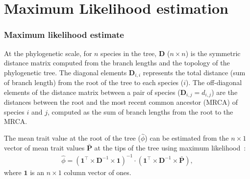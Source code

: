 \documentclass{article}
\newcommand{\Multiply}{\cdot}
\newcommand{\MultiplyMatrix}{\times}
\newcommand{\UniDimArray}[1]{\bm{#1}}
\newcommand{\BiDimArray}[1]{\bm{#1}}
\newcommand{\tr}{^{\intercal}}
\newcommand{\inv}{^{-1}}
\newcommand{\Trait}{P}
\newcommand{\Spi}{i}
\newcommand{\Spj}{j}
\newcommand{\NbrTaxa}{n}
\newcommand{\NucDiv}{d_{\Spi, \Spj}}
\newcommand{\VecTrait}{\UniDimArray{\bar{\Trait}}}
\newcommand{\VecOne}{\UniDimArray{1}}
\newcommand{\Distance}{\BiDimArray{D}}
\newcommand{\DistanceMatrix}{\BiDimArray{\Distance}}
\newcommand{\RootTrait}{\phi}
\newcommand{\EstRootTrait}{\hat{\RootTrait}}
\begin{document}
\newpage
\section{Maximum Likelihood estimation}\label{sec:maximum-likelihood-estimation}

\subsubsection*{Maximum likelihood estimate}
At the phylogenetic scale, for $\NbrTaxa$ species in the tree, $\DistanceMatrix$ ($\NbrTaxa \times \NbrTaxa$) is the symmetric distance matrix computed from the branch lengths and the topology of the phylogenetic tree.
The diagonal elements $\Distance_{\Spi,\Spi}$ represents the total distance (sum of branch length) from the root of the tree to each species ($\Spi$).
The off-diagonal elements of the distance matrix between a pair of species ($\Distance_{\Spi,\Spj} = \NucDiv$) are the distances between the root and the most recent common ancestor (MRCA) of species $\Spi$ and $\Spj$, computed as the sum of branch lengths from the root to the MRCA.

The mean trait value at the root of the tree ($\EstRootTrait$) can be estimated from the $\NbrTaxa \times 1$ vector of mean trait values $\VecTrait$ at the tips of the tree using maximum likelihood~\citep{omeara_testing_2006}:
\begin{gather}
    \EstRootTrait = \left( \VecOne\tr \MultiplyMatrix \DistanceMatrix\inv \MultiplyMatrix \VecOne \right)\inv \Multiply \left( \VecOne\tr \MultiplyMatrix \DistanceMatrix\inv \MultiplyMatrix \VecTrait \right), \label{eq:estimated-root-trait}
\end{gather}
where $\VecOne$ is an $\NbrTaxa \times 1$ column vector of ones.
\end{document}
